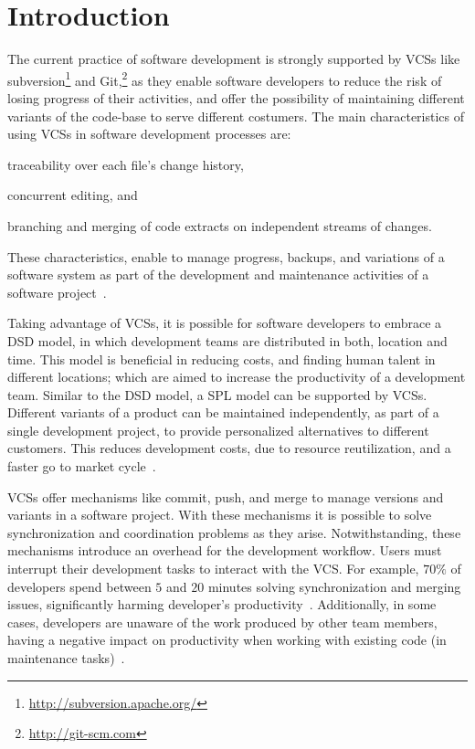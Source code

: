 
\section{Introduction}
\label{sec:introduction}

The current practice of software development is strongly supported by \acp{VCS} like 
subversion\footnote{\url{http://subversion.apache.org/}} and Git,\footnote{\url{http://git-scm.com}} as 
they enable software developers to reduce the risk of losing progress of their activities, and offer the 
possibility of maintaining different variants of the code-base to serve different costumers.
The main characteristics of using \acp{VCS} in software development processes are:
\begin{enumerate*}[label=(\arabic*)]
\item traceability over each file's change history, 
\item concurrent editing, and 
\item branching and merging of code extracts on independent streams of changes. 
\end{enumerate*}
These characteristics, enable to manage progress, backups, and variations of a software system as 
part of the development and maintenance activities of a software project~\cite{spinellis05}.

Taking advantage of \acp{VCS},  it is possible for software developers to embrace a \ac{DSD} model, in 
which development teams are distributed in both, location and time. This model is beneficial in reducing 
costs, and finding human talent in different locations; which are aimed to increase the productivity of a 
development team. 
Similar to the \ac{DSD} model, a \ac{SPL} model can be supported by \acp{VCS}. Different variants of a 
product can be maintained independently, as part of a single development project, to provide 
personalized alternatives to different customers. This reduces development costs, due to resource 
reutilization, and a faster go to market cycle~\cite{pohl05}.  

\acp{VCS} offer mechanisms like commit, push, and merge to manage versions and variants in a 
software project. With these mechanisms it is possible to solve synchronization and coordination 
problems as they arise. 
Notwithstanding, these mechanisms introduce an overhead for the development workflow. Users must interrupt their development tasks to interact with the \ac{VCS}. For example, $70\%$ of developers spend between $5$ and  $20$ minutes solving synchronization and merging issues, significantly harming developer's productivity~\cite{estler14}. Additionally, in some cases, developers are unaware of the work produced by other team members, having a negative impact on productivity when working with existing code (\eg in maintenance tasks)~\cite{dourish92}.

